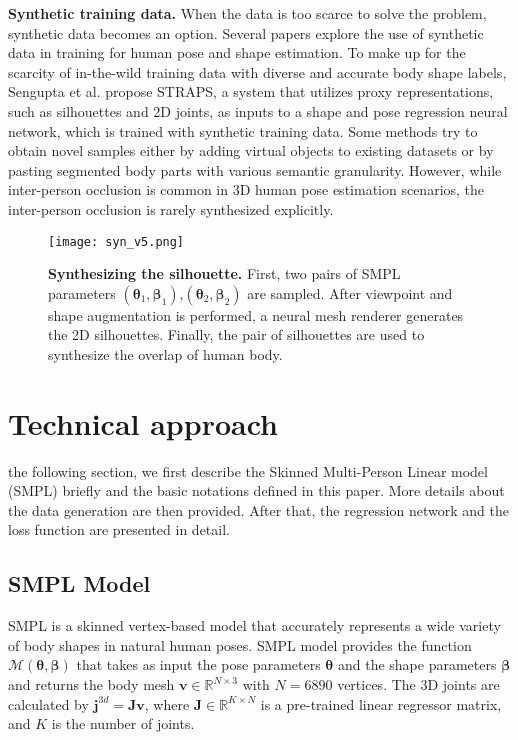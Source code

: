 \documentclass[journal]{IEEEtran}
\begin{document}
\noindent\textbf{Synthetic training data.} When the data is too scarce to solve the problem, synthetic data becomes an option. Several papers explore the use of synthetic data in training for human pose and shape estimation. To make up for the scarcity of in-the-wild training data with diverse and accurate body shape labels, Sengupta et al. \cite{STRAPS2020BMVC} propose STRAPS, a system that utilizes proxy representations, such as silhouettes and 2D joints, as inputs to a shape and pose regression neural network, which is trained with synthetic training data. Some methods \cite{bin2020adversarial,zhang2020object} try to obtain novel samples either by adding virtual objects to existing datasets or by pasting segmented body parts with various semantic granularity. However, while inter-person occlusion is common in 3D human pose estimation scenarios, the inter-person occlusion is rarely synthesized explicitly. 

\begin{figure*}[!htp]
    \centerline{\texttt{[image: syn\_v5.png]}}
    \caption{\textbf{Synthesizing the silhouette.} First, two pairs of SMPL parameters $(\bm{\theta}_1, \bm{\beta}_1)$,$(\bm{\theta}_2, \bm{\beta}_2)$ are sampled. After viewpoint and shape augmentation is performed, a neural mesh renderer generates the 2D silhouettes. Finally, the pair of silhouettes are used to synthesize the overlap of human body.}
    \label{fig:syn_input}
\end{figure*}



\quad 

\section{Technical approach}
 the following section, we first describe the Skinned Multi-Person Linear model (SMPL) briefly and the basic notations defined in this paper. More details about the data generation are then provided. After that, the regression network and the loss function are presented in detail.

\subsection{SMPL Model}
 SMPL is a skinned vertex-based model that accurately represents a wide variety of body shapes in natural human poses. SMPL model provides the function $\mathcal{M}(\bm{\theta}, \bm{\beta})$ that takes as input the pose parameters $\bm{\theta}$ and the shape parameters $\bm{\beta}$ and returns the body mesh $\bm{v} \in \mathbb{R}^{N \times 3}$ with $N=6890$ vertices. The 3D joints are calculated by $\bm{j}^{3d}=\bm{J}\bm{v}$, where $\bm{J}\in \mathbb{R}^{K \times N}$ is a pre-trained linear regressor matrix, and $K$ is the number of joints.  
\end{document}
